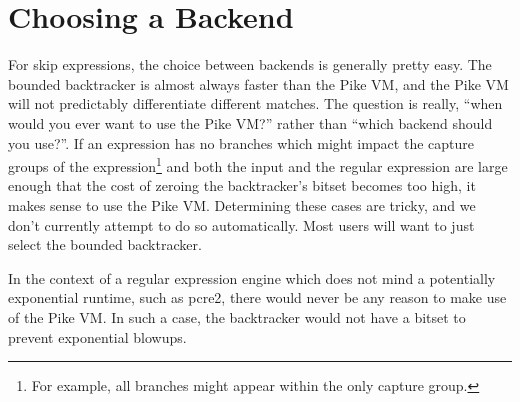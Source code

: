 \section{Choosing a Backend}

For skip expressions, the choice between backends is generally
pretty easy. The bounded backtracker is almost always faster
than the Pike VM, and the Pike VM will not predictably
differentiate different matches. The question is really,
``when would you ever want to use the Pike VM?'' rather than
``which backend should you use?''. If an expression has
no branches which might impact the capture groups of
the expression\footnote{For example, all branches might appear
within the only capture group.} and both the input and
the regular expression are large enough that the cost of
zeroing the backtracker's bitset becomes too high, it
makes sense to use the Pike VM. Determining these cases
are tricky, and we don't currently attempt to do
so automatically. Most users will want to just select
the bounded backtracker.

In the context of a regular expression engine which does not
mind a potentially exponential runtime, such as pcre2, there
would never be any reason to make use of the Pike VM. In such
a case, the backtracker would not have a bitset to prevent
exponential blowups.
